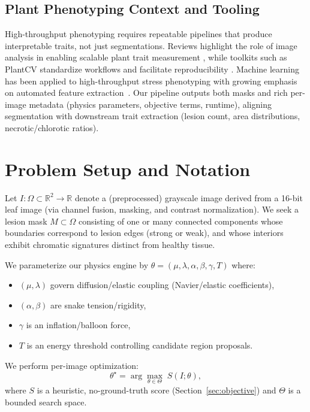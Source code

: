 \documentclass[11pt,a4paper]{article}
\newcommand{\R}{\mathbb{R}}
\begin{document}
\subsection{Plant Phenotyping Context and Tooling}
High-throughput phenotyping requires repeatable pipelines that produce interpretable traits, not just segmentations. Reviews highlight the role of image analysis in enabling scalable plant trait measurement \citep{gehan2017high,mahlein2016plant}, while toolkits such as PlantCV standardize workflows and facilitate reproducibility \citep{plantcv2025}. Machine learning has been applied to high-throughput stress phenotyping with growing emphasis on automated feature extraction~\citep{singh2016machine}. Our pipeline outputs both masks and rich per-image metadata (physics parameters, objective terms, runtime), aligning segmentation with downstream trait extraction (lesion count, area distributions, necrotic/chlorotic ratios).

\section{Problem Setup and Notation}
Let $I:\Omega\subset\R^2\rightarrow\R$ denote a (preprocessed) grayscale image derived from a 16-bit leaf image (via channel fusion, masking, and contrast normalization). We seek a lesion mask $M\subset\Omega$ consisting of one or many connected components whose boundaries correspond to lesion edges (strong or weak), and whose interiors exhibit chromatic signatures distinct from healthy tissue.

We parameterize our physics engine by $\theta = (\mu,\lambda,\alpha,\beta,\gamma,T)$ where:
\begin{itemize}
    \item $(\mu,\lambda)$ govern diffusion/elastic coupling (Navier/elastic coefficients),
    \item $(\alpha,\beta)$ are snake tension/rigidity,
    \item $\gamma$ is an inflation/balloon force,
    \item $T$ is an energy threshold controlling candidate region proposals.
\end{itemize}
We perform per-image optimization:
\begin{equation}
\theta^\star = \arg\max_{\theta \in \Theta} \; S(I;\theta),
\end{equation}
where $S$ is a heuristic, no-ground-truth score (Section~\ref{sec:objective}) and $\Theta$ is a bounded search space.
\end{document}
